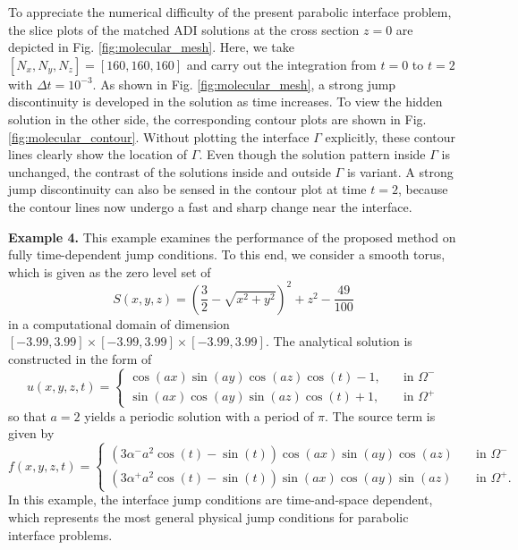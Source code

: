 \documentclass[dissertation]{uathesis}
\begin{document}
\begin{body}
To appreciate the numerical difficulty of the present parabolic interface problem, the slice plots of the 
matched ADI solutions at the cross section $z=0$ are depicted in Fig. \ref{fig:molecular_mesh}.
Here, we take $[N_{x},N_{y},N_{z}]=[160,160,160]$ and carry out the integration from $t=0$ to $t=2$ with
$\Delta t=10^{-3}$. 
As shown in Fig. \ref{fig:molecular_mesh}, a strong jump discontinuity is developed in the solution as time increases. 
To view the hidden solution in the other side, the corresponding contour plots are shown in 
Fig. \ref{fig:molecular_contour}.
Without plotting the interface $\Gamma$ explicitly, these contour lines clearly show the location
of $\Gamma$. Even though the solution pattern inside $\Gamma$ is unchanged, the contrast of the solutions
inside and outside $\Gamma$ is variant. A strong jump discontinuity can also be sensed in the contour
plot at time $t=2$, because the contour lines now undergo a fast and sharp change near the interface. 


{\flushleft \bf Example 4.} This example examines the performance of the proposed method on fully time-dependent jump conditions. To this end, we consider a smooth torus, which is given as the zero level set of
%
\begin{equation}
S(x,y,z) = (\frac{3}{2}-\sqrt{x^{2}+y^{2}})^{2}+z^{2}-\frac{49}{100}
\end{equation}
%
in a computational domain of dimension $[-3.99,3.99]\times[-3.99,3.99]\times[-3.99,3.99]$. The analytical solution is constructed in the form of 
%
\begin{equation} \label{analytical_eqn_2}
u(x,y,z,t)= 
\begin{cases}
\cos(ax)\sin(ay)\cos(az)\cos(t)-1, \quad   &\mbox{in } \Omega^{-} \\
\sin(ax)\cos(ay)\sin(az)\cos(t)+1,  \quad   &\mbox{in } \Omega^{+}
\end{cases}
\end{equation}
%
so that $a=2$ yields a periodic solution with a period of $\pi$. The source term is given by
%
\begin{equation} \label{source_eqn_2}
f(x,y,z,t)= 
\begin{cases}
(3 \alpha^{-} a^{2}\cos(t)-\sin(t)) \cos(ax)\sin(ay)\cos(az) \quad   &\mbox{in } \Omega^{-} \\
(3 \alpha^{+} a^{2}\cos(t)-\sin(t)) \sin(ax)\cos(ay)\sin(az)  \quad   &\mbox{in } \Omega^{+}.
\end{cases}
\end{equation}
%
In this example, the interface jump conditions are time-and-space dependent, which represents the most general physical jump conditions for parabolic interface problems. 


\end{body}
\end{document}
